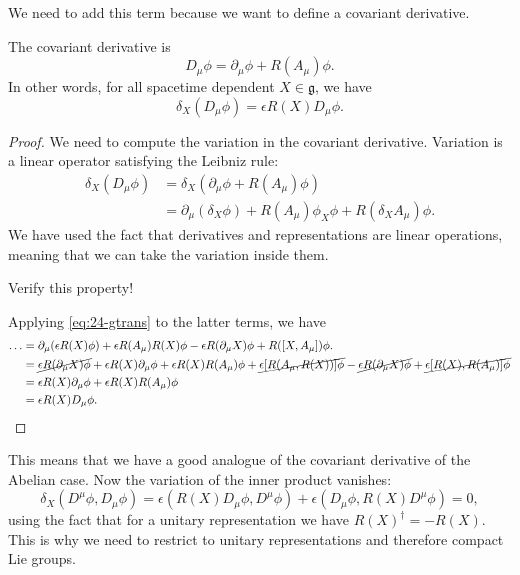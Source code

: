 We need to add this term because we want to define a covariant derivative.
\begin{claim}
  The covariant derivative is
  \begin{equation}
    \boxed{D_{\mu} \phi = \partial_{\mu} \phi + R(A_{\mu}) \phi}.
  \end{equation}
  In other words, for all spacetime dependent $X \in \mathfrak{g}$, we have
  \begin{equation}
    \delta_X(D_{\mu} \phi) = \epsilon R(X) D_{\mu} \phi.
  \end{equation}
\end{claim}
\begin{proof}
  We need to compute the variation in the covariant derivative. Variation is a linear operator satisfying the Leibniz rule:
  \begin{align}
    \delta_X (D_{\mu} \phi) &= \delta_X (\partial_{\mu} \phi + R(A_{\mu}) \phi) \\
			    &= \partial_{\mu}(\delta_X \phi) + R(A_{\mu}) \phi_X \phi + R(\delta_X A_{\mu}) \phi.
  \end{align}
  We have used the fact that derivatives and representations are linear operations, meaning that we can take the variation inside them.
  \begin{exercise}
    Verify this property!
  \end{exercise}
  Applying \eqref{eq:24-gtrans} to the latter terms, we have
  \begin{align}
    \dots &= \partial_{\mu} ( \epsilon R(X) \phi) + \epsilon R(A_{\mu})R(X) \phi - \epsilon R(\partial_{\mu} X) \phi + R([X, A_{\mu}])\phi. \\
	  &= \cancel{\epsilon R(\partial_{\mu} X) \phi} + \epsilon R(X) \partial_{\mu} \phi + \epsilon R(X) R(A_{\mu}) \phi + \cancel{\epsilon [R(A_{\mu}, R(X))] \phi} - \cancel{\epsilon R(\partial_{\mu} X) \phi} + \cancel{\epsilon [R(X), R(A_{\mu})]\phi} \\
	  &= \epsilon R(X) \partial_{\mu} \phi + \epsilon R(X) R(A_{\mu}) \phi \\
	  &= \epsilon R(X) D_{\mu} \phi.
  \end{align}
\end{proof}
This means that we have a good analogue of the covariant derivative of the Abelian case.
Now the variation of the inner product vanishes:
\begin{equation}
  \delta_X (D^{\mu} \phi, D_{\mu} \phi)= \epsilon (R(X) D_{\mu} \phi, D^{\mu} \phi) + \epsilon (D_{\mu} \phi, R(X) D^{\mu} \phi) = 0,
\end{equation}
using the fact that for a unitary representation we have $R(X)^{\dagger} = - R(X)$. This is why we need to restrict to unitary representations and therefore compact Lie groups.

